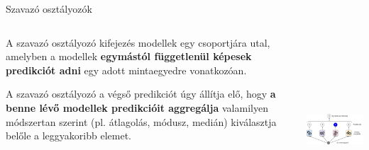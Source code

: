 \documentclass[english, aspectratio=169]{beamer}
\begin{document}
\begin{frame}{Szavazó osztályozók}
\begin{columns}
\begin{column}{.5\textwidth}
A szavazó osztályozó kifejezés modellek egy csoportjára utal, amelyben a modellek \textbf{egymástól függetlenül képesek predikciót adni} egy adott mintaegyedre vonatkozóan.\par\smallskip
A szavazó osztályozó a végső predikciót úgy állítja elő, hogy \textbf{a benne lévő modellek predikcióit aggregálja} valamilyen módszertan szerint (pl. átlagolás, módusz, medián) kiválasztja belőle a leggyakoribb elemet. 
\end{column}
\begin{column}{.5\textwidth}
\begin{center}
\includegraphics[width=7cm, height=7cm, keepaspectratio]{images/ensemble_3.png}
\end{center}
\end{column}
\end{columns}
\end{frame}
\end{document}
